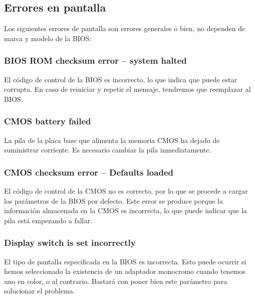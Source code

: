 

	\subsection{Errores en pantalla}\label{sub:errores en pantalla}
	
	Los siguientes errores de pantalla son errores generales o bien, no
	dependen de marca y modelo de la BIOS:

		\subsubsection{BIOS ROM checksum error – system halted}

		El código de control de la BIOS es incorrecto, lo que indica que puede
		estar corrupta. En caso de reiniciar y repetir el mensaje, tendremos
		que reemplazar al BIOS.

		\subsubsection{CMOS battery failed}

		La pila de la placa base que alimenta la memoria CMOS ha dejado de
		suministrar corriente. Es necesario cambiar la pila inmediatamente.

		\subsubsection{CMOS checksum error – Defaults loaded}

		El código de control de la CMOS no es correcto, por lo que se
		procede a cargar los parámetros de la BIOS por defecto. Este error
		se produce porque la información almacenada en la CMOS es
		incorrecta, lo que puede indicar que la pila está empezando a
		fallar.

		\subsubsection{Display switch is set incorrectly}

		El tipo de pantalla especificada en la BIOS es incorrecta. Esto puede
		ocurrir si hemos seleccionado la existencia de un adaptador monocromo
		cuando tenemos uno en color, o al contrario. Bastará con poner bien
		este parámetro para solucionar el problema.

